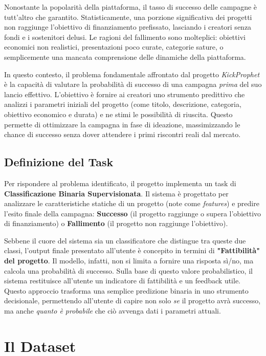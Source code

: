 \documentclass[a4paper,14pt]{extarticle}
\begin{document}
Nonostante la popolarità della piattaforma, il tasso di successo delle campagne è tutt'altro che garantito. Statisticamente, una porzione significativa dei progetti non raggiunge l'obiettivo di finanziamento prefissato, lasciando i creatori senza fondi e i sostenitori delusi. Le ragioni del fallimento sono molteplici: obiettivi economici non realistici, presentazioni poco curate, categorie sature, o semplicemente una mancata comprensione delle dinamiche della piattaforma.

In questo contesto, il problema fondamentale affrontato dal progetto \textit{KickProphet} è la capacità di valutare la probabilità di successo di una campagna \textit{prima} del suo lancio effettivo.
L'obiettivo è fornire ai creatori uno strumento predittivo che analizzi i parametri iniziali del progetto (come titolo, descrizione, categoria, obiettivo economico e durata) e ne stimi le possibilità di riuscita. Questo permette di ottimizzare la campagna in fase di ideazione, massimizzando le chance di successo senza dover attendere i primi riscontri reali dal mercato.

\subsection{Definizione del Task}
Per rispondere al problema identificato, il progetto implementa un task di \textbf{Classificazione Binaria Supervisionata}.
Il sistema è progettato per analizzare le caratteristiche statiche di un progetto (note come \textit{features}) e predire l'esito finale della campagna: \textbf{Successo} (il progetto raggiunge o supera l'obiettivo di finanziamento) o \textbf{Fallimento} (il progetto non raggiunge l'obiettivo).

Sebbene il cuore del sistema sia un classificatore che distingue tra queste due classi, l'output finale presentato all'utente è concepito in termini di \textbf{"Fattibilità" del progetto}. 
Il modello, infatti, non si limita a fornire una risposta sì/no, ma calcola una probabilità di successo. Sulla base di questo valore probabilistico, il sistema restituisce all'utente un indicatore di fattibilità e un feedback utile. Questo approccio trasforma una semplice predizione binaria in uno strumento decisionale, permettendo all'utente di capire non solo \textit{se} il progetto avrà successo, ma anche \textit{quanto è probabile} che ciò avvenga dati i parametri attuali.


\section{Il Dataset}
\end{document}
